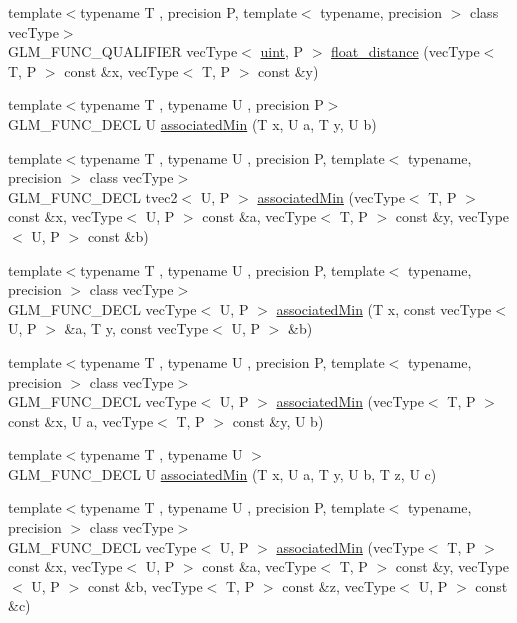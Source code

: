 \begin{DoxyCompactItemize}
\item 
{\footnotesize template$<$typename T , precision P, template$<$ typename, precision $>$ class vec\+Type$>$ }\\G\+L\+M\+\_\+\+F\+U\+N\+C\+\_\+\+Q\+U\+A\+L\+I\+F\+I\+E\+R vec\+Type$<$ \hyperlink{stb__image_8c_a91ad9478d81a7aaf2593e8d9c3d06a14}{uint}, P $>$ \hyperlink{namespaceglm_a2e00104097b2f3967e97131933595309}{float\+\_\+distance} (vec\+Type$<$ T, P $>$ const \&x, vec\+Type$<$ T, P $>$ const \&y)
\item 
{\footnotesize template$<$typename T , typename U , precision P$>$ }\\G\+L\+M\+\_\+\+F\+U\+N\+C\+\_\+\+D\+E\+C\+L U \hyperlink{group__gtx__associated__min__max_gacc01bd272359572fc28437ae214a02df}{associated\+Min} (T x, U a, T y, U b)
\item 
{\footnotesize template$<$typename T , typename U , precision P, template$<$ typename, precision $>$ class vec\+Type$>$ }\\G\+L\+M\+\_\+\+F\+U\+N\+C\+\_\+\+D\+E\+C\+L tvec2$<$ U, P $>$ \hyperlink{group__gtx__associated__min__max_ga8b538d10872626668a078e2bd495af25}{associated\+Min} (vec\+Type$<$ T, P $>$ const \&x, vec\+Type$<$ U, P $>$ const \&a, vec\+Type$<$ T, P $>$ const \&y, vec\+Type$<$ U, P $>$ const \&b)
\item 
{\footnotesize template$<$typename T , typename U , precision P, template$<$ typename, precision $>$ class vec\+Type$>$ }\\G\+L\+M\+\_\+\+F\+U\+N\+C\+\_\+\+D\+E\+C\+L vec\+Type$<$ U, P $>$ \hyperlink{group__gtx__associated__min__max_ga1dccff48fa5650c746533de83467da6e}{associated\+Min} (T x, const vec\+Type$<$ U, P $>$ \&a, T y, const vec\+Type$<$ U, P $>$ \&b)
\item 
{\footnotesize template$<$typename T , typename U , precision P, template$<$ typename, precision $>$ class vec\+Type$>$ }\\G\+L\+M\+\_\+\+F\+U\+N\+C\+\_\+\+D\+E\+C\+L vec\+Type$<$ U, P $>$ \hyperlink{group__gtx__associated__min__max_ga076717f4e07c6ae725cc1382d1ac4869}{associated\+Min} (vec\+Type$<$ T, P $>$ const \&x, U a, vec\+Type$<$ T, P $>$ const \&y, U b)
\item 
{\footnotesize template$<$typename T , typename U $>$ }\\G\+L\+M\+\_\+\+F\+U\+N\+C\+\_\+\+D\+E\+C\+L U \hyperlink{group__gtx__associated__min__max_gad0aa8f86259a26d839d34a3577a923fc}{associated\+Min} (T x, U a, T y, U b, T z, U c)
\item 
{\footnotesize template$<$typename T , typename U , precision P, template$<$ typename, precision $>$ class vec\+Type$>$ }\\G\+L\+M\+\_\+\+F\+U\+N\+C\+\_\+\+D\+E\+C\+L vec\+Type$<$ U, P $>$ \hyperlink{group__gtx__associated__min__max_ga5bc6b9acbf9e060d58a342fbe3b73d43}{associated\+Min} (vec\+Type$<$ T, P $>$ const \&x, vec\+Type$<$ U, P $>$ const \&a, vec\+Type$<$ T, P $>$ const \&y, vec\+Type$<$ U, P $>$ const \&b, vec\+Type$<$ T, P $>$ const \&z, vec\+Type$<$ U, P $>$ const \&c)

\end{DoxyCompactItemize}
